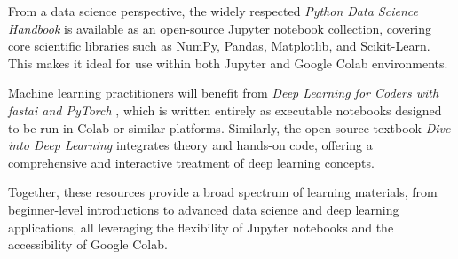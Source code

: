 \documentclass[11pt]{article}
\begin{document}
From a data science perspective, the widely respected 
\emph{Python Data Science Handbook} \cite{vanderplas2016python} is available as 
an open-source Jupyter notebook collection, covering core scientific libraries 
such as NumPy, Pandas, Matplotlib, and Scikit-Learn. This makes it ideal for use 
within both Jupyter and Google Colab environments.

Machine learning practitioners will benefit from 
\emph{Deep Learning for Coders with fastai and PyTorch} \cite{howard2020deep}, 
which is written entirely as executable notebooks designed to be run in Colab 
or similar platforms. Similarly, the open-source textbook 
\emph{Dive into Deep Learning} \cite{zhang2021dive} integrates theory and 
hands-on code, offering a comprehensive and interactive treatment of deep learning 
concepts.

Together, these resources provide a broad spectrum of learning materials, 
from beginner-level introductions to advanced data science and deep learning 
applications, all leveraging the flexibility of Jupyter notebooks and the 
accessibility of Google Colab.


\end{document}
